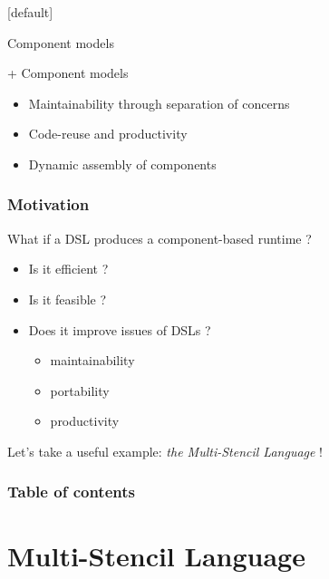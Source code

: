 \documentclass{beamer}
\makeatletter
\newenvironment{withoutheadline}{
        \setbeamertemplate{headline}[default]
        \def\beamer@entrycode{\vspace*{-\headheight}}
    }{}
\makeatother
\begin{document}
\begin{withoutheadline}
\begin{frame}
\begin{block}{Component models}
\begin{itemize}
\end{itemize}
\end{block}
\begin{block}{+ Component models}
\begin{itemize}
\item Maintainability through separation of concerns
\item Code-reuse and productivity
\item Dynamic assembly of components
\end{itemize}
\end{block}
\end{frame}
\begin{frame}
\frametitle{Motivation} %
What if a DSL produces a component-based runtime ?

\begin{itemize}
\item Is it efficient ?
\item Is it feasible ?
\item Does it improve issues of DSLs ?
\begin{itemize}
\item maintainability
\item portability
\item productivity
\end{itemize}
\end{itemize}

Let's take a useful example: \textit{the Multi-Stencil Language }!
\end{frame}

\begin{frame}
\frametitle{Table of contents}
    \tableofcontents[hideallsubsections]
\end{frame}

\end{withoutheadline}

\section{Multi-Stencil Language}
\end{document}
